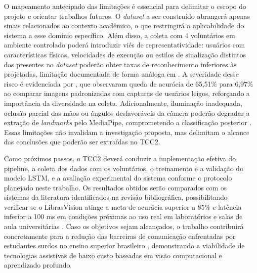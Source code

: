 O mapeamento antecipado das limitações é essencial para delimitar o escopo do projeto e orientar trabalhos futuros. O \textit{dataset} a ser construído abrangerá apenas sinais relacionados ao contexto acadêmico, o que restringirá a aplicabilidade do sistema a esse domínio específico. Além disso, a coleta com 4 voluntários em ambiente controlado poderá introduzir viés de representatividade: usuários com características físicas, velocidades de execução ou estilos de sinalização distintos dos presentes no \textit{dataset} poderão obter taxas de reconhecimento inferiores às projetadas, limitação documentada de forma análoga em \cite{abdulhussein:20}. A severidade desse risco é evidenciada por , que observaram queda de acurácia de 65,51\% para 6,97\% ao comparar imagens padronizadas com capturas de usuários leigos, reforçando a importância da diversidade na coleta. Adicionalmente, iluminação inadequada, oclusão parcial das mãos ou ângulos desfavoráveis da câmera poderão degradar a extração de \textit{landmarks} pelo MediaPipe, comprometendo a classificação posterior \cite{jain:24}. Essas limitações não invalidam a investigação proposta, mas delimitam o alcance das conclusões que poderão ser extraídas no TCC2.

Como próximos passos, o TCC2 deverá conduzir a implementação efetiva do pipeline, a coleta dos dados com os voluntários, o treinamento e a validação do modelo LSTM, e a avaliação experimental do sistema conforme o protocolo planejado neste trabalho. Os resultados obtidos serão comparados com os sistemas da literatura identificados na revisão bibliográfica, possibilitando verificar se o LibrasVision atinge a meta de acurácia superior a 85\% e latência inferior a 100 ms em condições próximas ao uso real em laboratórios e salas de aula universitárias \cite{costa-i3d:25}. Caso os objetivos sejam alcançados, o trabalho contribuirá concretamente para a redução das barreiras de comunicação enfrentadas por estudantes surdos no ensino superior brasileiro \cite{dockens:18}, demonstrando a viabilidade de tecnologias assistivas de baixo custo baseadas em visão computacional e aprendizado profundo.
